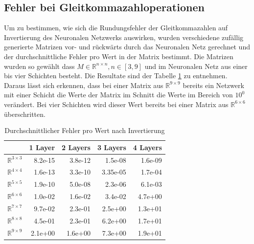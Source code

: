\documentclass[Interploate_hadwritten_Digits.tex]{subfiles}
\begin{document}
	\subsection{Fehler bei Gleitkommazahloperationen}
	\label{sec:results_error_inverse}
	Um zu bestimmen, wie sich die Rundungsfehler der Gleitkommazahlen auf Invertierung des Neuronalen Netzwerks auswirken, wurden verschiedene zufällig generierte Matrizen vor- und rückwärts durch das Neuronalen Netz gerechnet und der durchschnittliche Fehler pro Wert in der Matrix bestimmt. Die Matrizen wurden so gewählt dass $ M \in \mathbb{R}^{n \times n}, n \in [3, 9] $ und im Neuronalen Netz aus einer bis vier Schichten besteht. Die Resultate sind der Tabelle \ref{tbl:reverse_error} zu entnehmen. Daraus lässt sich erkennen, dass bei einer Matrix aus $ \mathbb{R}^{9 \times 9} $ bereits ein Netzwerk mit einer Schicht die Werte der Matrix im Schnitt die Werte im Bereich von $ 10^{0} $ verändert. Bei vier Schichten wird dieser Wert bereits bei einer Matrix aus $ \mathbb{R}^{6 \times 6} $ überschritten.
	\begin{table}[H]
		\centering
		\begin{tabular}{|l|r|r|r|r|}
			\hline
			 & 1 Layer & 2 Layers & 3 Layers & 4 Layers  \\ \hline
			$ \mathbb{R}^{3 \times 3} $ & 8.2e-15 & 3.8e-12 & 1.5e-08 & 1.6e-09 \\ \hline
			$ \mathbb{R}^{4 \times 4} $ & 1.6e-13 & 3.3e-10 & 3.35e-05 & 1.7e-04 \\ \hline
			$ \mathbb{R}^{5 \times 5} $ & 1.9e-10 & 5.0e-08 & 2.3e-06 & 6.1e-03 \\ \hline
			$ \mathbb{R}^{6 \times 6} $ & 1.0e-02 & 1.6e-02 & 3.4e-02 & 4.7e+00 \\ \hline
			$ \mathbb{R}^{7 \times 7} $ & 9.7e-02 & 2.3e-01 & 2.5e+00 & 1.3e+01 \\ \hline
			$ \mathbb{R}^{8 \times 8} $ & 4.5e-01 & 2.3e-01 & 6.2e+00 & 1.7e+01 \\ \hline
			$ \mathbb{R}^{9 \times 9} $ & 2.1e+00 & 1.6e+00 & 7.3e+00 & 1.9e+01 \\ \hline
		\end{tabular}
		\caption{Durchschnittlicher Fehler pro Wert nach Invertierung}
		\label{tbl:reverse_error}
	\end{table}	
	
\end{document}
